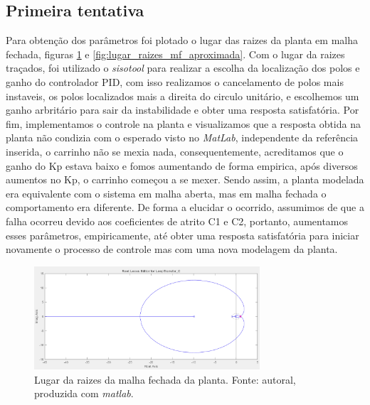 \documentclass{ifacconf}
\begin{document}
\subsection{Primeira tentativa} %
Para obtenção dos parâmetros foi plotado o lugar das raizes da planta em malha fechada, figuras \ref{fig:lugar_raizes_mf} e \ref{fig:lugar_raizes_mf_aproximada}.
Com o lugar da raizes traçados, foi utilizado o \textit{sisotool} para realizar a escolha da localização dos polos e ganho do controlador PID, com isso realizamos
o cancelamento de polos mais instaveis, os polos localizados mais a direita do circulo unitário, e escolhemos um ganho arbritário para sair da instabilidade e obter
uma resposta satisfatória. Por fim, implementamos o controle na planta e visualizamos que a resposta obtida na planta não condizia com o esperado visto no \textit{MatLab},
independente da referência inserida, o carrinho não se mexia nada, consequentemente, acreditamos que o ganho do Kp estava baixo e fomos aumentando de forma empirica, 
após diversos aumentos no Kp, o carrinho começou a se mexer. Sendo assim, a planta modelada era equivalente com o sistema em malha aberta, mas em malha fechada o comportamento
era diferente. De forma a elucidar o ocorrido, assumimos de que a falha ocorreu devido aos coeficientes de atrito C1 e C2, portanto, aumentamos esses parâmetros, empiricamente, até
obter uma resposta satisfatória para iniciar novamente o processo de controle mas com uma nova modelagem da planta. 

\begin{figure}[!htb]
  \begin{center}
  \includegraphics[width=8.4cm]{figures/lugar_raizes_mf.png}    %
  \caption{Lugar da raizes da malha fechada da planta. Fonte: autoral, produzida com \textit{matlab}.} 
  \label{fig:lugar_raizes_mf}
  \end{center}
\end{figure}
\end{document}

